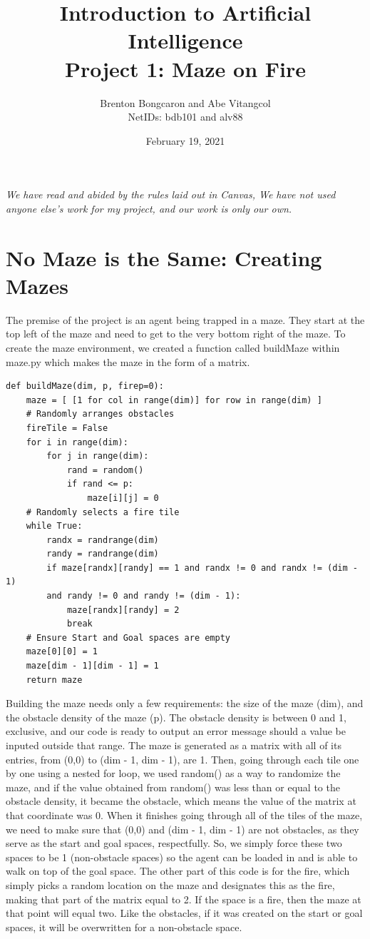 \documentclass[11pt]{article}
\title{\textbf{Introduction to Artificial Intelligence\\
		\large Project 1: Maze on Fire}}
\author{Brenton Bongcaron and Abe Vitangcol\\NetIDs: bdb101 and alv88}
\date{February 19, 2021}
\begin{document}
	\maketitle
\textit{We have read and abided by the rules laid out in Canvas, We have not used anyone else's work for my project, and our work is only our own.}
	\pagebreak
\section{No Maze is the Same: Creating Mazes}
The premise of the project is an agent being trapped in a maze. They start at the top left of the maze and need to get to the very bottom right of the maze. To create the maze environment, we created a function called buildMaze within maze.py which makes the maze in the form of a matrix.
\begin{verbatim}
def buildMaze(dim, p, firep=0):
    maze = [ [1 for col in range(dim)] for row in range(dim) ]
    # Randomly arranges obstacles
    fireTile = False
    for i in range(dim):
        for j in range(dim):
            rand = random()
            if rand <= p:
                maze[i][j] = 0
    # Randomly selects a fire tile
    while True:
        randx = randrange(dim)
        randy = randrange(dim)
        if maze[randx][randy] == 1 and randx != 0 and randx != (dim - 1)
        and randy != 0 and randy != (dim - 1):
            maze[randx][randy] = 2
            break
    # Ensure Start and Goal spaces are empty
    maze[0][0] = 1
    maze[dim - 1][dim - 1] = 1
    return maze

\end{verbatim}
Building the maze needs only a few requirements: the size of the maze (dim), and the obstacle density of the maze (p). The obstacle density is between 0 and 1, exclusive, and our code is ready to output an error message should a value be inputed outside that range. The maze is generated as a matrix with all of its entries, from (0,0) to (dim - 1, dim - 1), are 1. Then, going through each tile one by one using a nested for loop, we used random() as a way to randomize the maze, and if the value obtained from random() was less than or equal to the obstacle density, it became the obstacle, which means the value of the matrix at that coordinate was 0. When it finishes going through all of the tiles of the maze, we need to make sure that (0,0) and (dim - 1, dim - 1) are not obstacles, as they serve as the start and goal spaces, respectfully. So, we simply force these two spaces to be 1 (non-obstacle spaces) so the agent can be loaded in and is able to walk on top of the goal space.
The other part of this code is for the fire, which simply picks a random location on the maze and designates this as the fire, making that part of the matrix equal to 2. If the space is a fire, then the maze at that point will equal two. Like the obstacles, if it was created on the start or goal spaces, it will be overwritten for a non-obstacle space.
	\pagebreak
\end{document}
